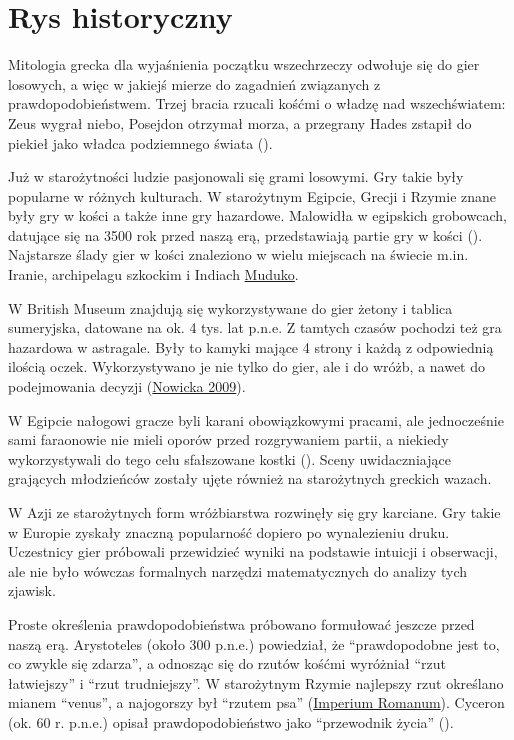 \documentclass[
  letterpaper,
  DIV=11,
  numbers=noendperiod]{scrreprt}
\begin{document}

\chapter{Rys historyczny}\label{rys-historyczny}

Mitologia grecka dla wyjaśnienia początku wszechrzeczy odwołuje się do
gier losowych, a więc w jakiejś mierze do zagadnień związanych z
prawdopodobieństwem. Trzej bracia rzucali kośćmi o władzę nad
wszechświatem: Zeus wygrał niebo, Posejdon otrzymał morza, a przegrany
Hades zstapił do piekieł jako władca podziemnego świata
().

Już w starożytności ludzie pasjonowali się grami losowymi. Gry takie
były popularne w różnych kulturach. W starożytnym Egipcie, Grecji i
Rzymie znane były gry w kości a także inne gry hazardowe. Malowidła w
egipskich grobowcach, datujące się na 3500 rok przed naszą erą,
przedstawiają partie gry w kości (). Najstarsze ślady gier w kości znaleziono w
wielu miejscach na świecie m.in. Iranie, archipelagu szkockim i Indiach
\href{https://muduko.com/historia-gry-w-kosci-od-astragali-po-roll-write/}{Muduko}.

W British Museum znajdują się wykorzystywane do gier żetony i tablica
sumeryjska, datowane na ok. 4 tys. lat p.n.e. Z tamtych czasów pochodzi
też gra hazardowa w astragale. Były to kamyki mające 4 strony i każdą z
odpowiednią ilością oczek. Wykorzystywano je nie tylko do gier, ale i do
wróżb, a nawet do podejmowania decyzji
(\href{https://pg.edu.pl/files/cnm/2021-03/2009_10_KN.pdf}{Nowicka
2009}).

W Egipcie nałogowi gracze byli karani obowiązkowymi pracami, ale
jednocześnie sami faraonowie nie mieli oporów przed rozgrywaniem partii,
a niekiedy wykorzystywali do tego celu sfałszowane kostki
().
Sceny uwidaczniające grających młodzieńców zostały ujęte również na
starożytnych greckich wazach.

W Azji ze starożytnych form wróżbiarstwa rozwinęły się gry karciane. Gry
takie w Europie zyskały znaczną popularność dopiero po wynalezieniu
druku. Uczestnicy gier próbowali przewidzieć wyniki na podstawie
intuicji i obserwacji, ale nie było wówczas formalnych narzędzi
matematycznych do analizy tych zjawisk.

Proste określenia prawdopodobieństwa próbowano formułować jeszcze przed
naszą erą. Arystoteles (około 300 p.n.e.) powiedział, że ``prawdopodobne
jest to, co zwykle się zdarza'', a odnosząc się do rzutów kośćmi
wyróżniał ``rzut łatwiejszy'' i ``rzut trudniejszy''. W starożytnym
Rzymie najlepszy rzut określano mianem ``venus'', a najogorszy był
``rzutem psa''
(\href{https://imperiumromanum.pl/spoleczenstwo/rozrywka-w-starozytnym-rzymie/hazard-antycznych-rzymian/}{Imperium
Romanum}). Cyceron (ok. 60 r. p.n.e.) opisał prawdopodobieństwo jako
``przewodnik życia'' ().
\end{document}
